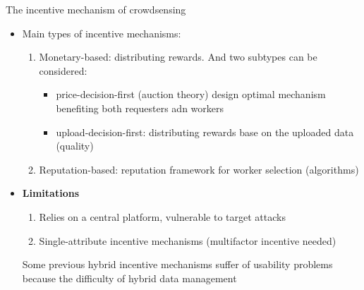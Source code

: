 \begin{frame}{The incentive mechanism of crowdsensing}
  \begin{itemize}
    \item Main types of incentive mechanisms:
          \begin{enumerate}
            \item \alert{Monetary-based}: distributing rewards. And two subtypes can be considered\cite{paper16}:
            	\begin{itemize}
            	\item \alert{price-decision-first} (auction theory) design optimal mechanism benefiting both requesters adn workers
            	\item \alert{upload-decision-first}: distributing rewards base on the uploaded data (quality)
          		\end{itemize}
            \item \alert{Reputation-based}: reputation framework for worker selection (algorithms)
          \end{enumerate}
    \item \textbf{Limitations}
    	\begin{enumerate}
            \item Relies on a central platform, vulnerable to target attacks
            \item Single-attribute incentive mechanisms (multifactor incentive needed)
          \end{enumerate}
     Some previous hybrid incentive mechanisms\cite{paper52} suffer of usability problems because the difficulty of hybrid data management
  \end{itemize}
\end{frame}